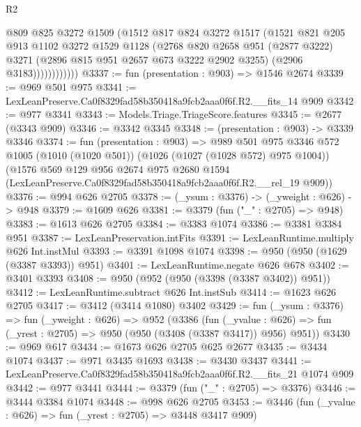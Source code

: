 \begin{lexlean}{R2}
\begin{coremodule}
                    @809
                    @825
                    @3272
                    @1509
                    (@1512
                      @817
                      @824
                      @3272
                      @1517
                      (@1521
                        @821
                        @205
                        @913
                        @1102
                        @3272
                        @1529
                        @1128
                        (@2768
                          @820
                          @2658
                          @951
                          (@2877 @3222)
                          @3271
                          (@2896 @815 @951 @2657 @673 @3222 @2902 @3255)
                          (@2906 @3183))))))))))))
@3337 := fun (presentation : @903) => @1546 @2674
@3339 := @969 @501 @975
@3341 := LexLeanPreserve.Ca0f8329fad58b350418a9fcb2aaa0f6f.R2.__fits_14 @909
@3342 := @977 @3341
@3343 := Models.Triage.TriageScore.features
@3345 := @2677 (@3343 @909)
@3346 := @3342 @3345
@3348 := (presentation : @903) -> @3339 @3346
@3374 := fun (presentation : @903) =>
  @989
    @501
    @975
    @3346
    @572
    @1005
    (@1010 (@1020 @501))
    (@1026 (@1027 (@1028 @572) @975 @1004))
    (@1576
      @569
      @129
      @956
      @2674
      @975
      @2680
      @1594
      (LexLeanPreserve.Ca0f8329fad58b350418a9fcb2aaa0f6f.R2.__rel_19 @909))
@3376 := @994 @626 @2705
@3378 := (_ysum : @3376) -> (_yweight : @626) -> @948
@3379 := @1609 @626
@3381 := @3379 (fun ("_" : @2705) => @948)
@3383 := @1613 @626 @2705
@3384 := @3383 @1074
@3386 := @3381 @3384 @951
@3387 := LexLeanPreservation.intFits
@3391 := LexLeanRuntime.multiply @626 Int.instMul
@3393 := @3391 @1098 @1074
@3398 := @950 (@950 (@1629 (@3387 @3393)) @951)
@3401 := LexLeanRuntime.negate @626 @678
@3402 := @3401 @3393
@3408 := @950 (@952 (@950 (@3398 (@3387 @3402)) @951))
@3412 := LexLeanRuntime.subtract @626 Int.instSub
@3414 := @1623 @626 @2705
@3417 := @3412 (@3414 @1080) @3402
@3429 := fun (_ysum : @3376) =>
  fun (_yweight : @626) =>
  @952
    (@3386
      (fun (_yvalue : @626) => fun (_yrest : @2705) => @950 (@950 (@3408 (@3387 @3417)) @956) @951))
@3430 := @969 @617
@3434 := @1673 @626 @2705 @625 @2677
@3435 := @3434 @1074
@3437 := @971 @3435 @1693
@3438 := @3430 @3437
@3441 := LexLeanPreserve.Ca0f8329fad58b350418a9fcb2aaa0f6f.R2.__fits_21 @1074 @909
@3442 := @977 @3441
@3444 := @3379 (fun ("_" : @2705) => @3376)
@3446 := @3444 @3384 @1074
@3448 := @998 @626 @2705
@3453 := @3446 (fun (_yvalue : @626) => fun (_yrest : @2705) => @3448 @3417 @909)

\end{coremodule}
\end{lexlean}
